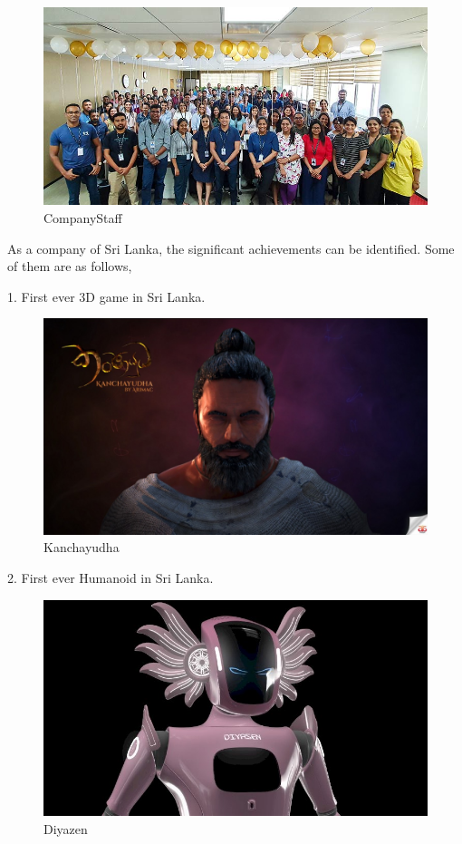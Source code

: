 \documentclass[twoside,12pt,times,onecolumn,a4paper]{report}
\begin{document}
\begin{figure}[H]
  \centering
   \includegraphics[width=12cm]{staff2}
  \caption{CompanyStaff}
\end{figure}


As a company of Sri Lanka, the significant achievements can be identified. Some of them are as follows,

1. First ever 3D game in Sri Lanka.
\begin{figure}[H]
  \centering
   \includegraphics[width=12cm]{game}
  \caption{Kanchayudha}
\end{figure}

2. First ever Humanoid  in Sri Lanka.
\begin{figure}[H]
  \centering
   \includegraphics[width=12cm]{robot}
  \caption{Diyazen}
\end{figure}
\end{document}
